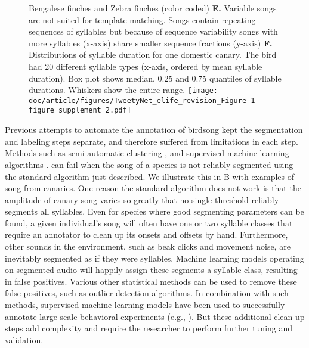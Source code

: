 \documentclass[9pt,lineno]{elife}
\begin{document}
\begin{figure}[!ht]
{Bengalese finches and Zebra finches (color coded)
\textbf{E.} Variable songs are not suited for template matching. 
Songs contain repeating sequences of syllables but because of sequence variability songs with more syllables (x-axis) share smaller sequence fractions (y-axis)
\textbf{F.} Distributions of syllable duration for one domestic canary. 
The bird had 20 different syllable types (x-axis, ordered by mean syllable duration). 
Box plot shows median, 0.25 and 0.75 quantiles of syllable durations. Whiskers show the entire range.
}{\texttt{[image: doc/article/figures/TweetyNet\_elife\_revision\_Figure 1 - figure supplement 2.pdf]}}\label{figsupp:sf2}
\end{figure} 

Previous attempts to automate the annotation of birdsong kept the segmentation and labeling steps separate,
and therefore suffered from limitations in each step.
Methods such as semi-automatic clustering 
\citep{burkett2015voice,daou2012computational}, 
and supervised machine learning algorithms
\citep{songbrowser, tachibana2014semi, nicholson2016comparison}.
can fail when the song of a species is not reliably  
segmented using the standard algorithm just described.
We illustrate this in B 
with examples of song from canaries. 
One reason the standard algorithm does not work is 
that the amplitude of canary song varies so greatly 
that no single threshold reliably segments all syllables. 
Even for species where good segmenting parameters can be found, 
a given individual's song will often have one or two syllable classes that require 
an annotator to clean up its onsets and offsets by hand.
Furthermore, other sounds in the environment, 
such as beak clicks and movement noise, are inevitably segmented as if they were syllables. 
Machine learning models operating on segmented audio 
will happily assign these segments a syllable class, 
resulting in false positives. 
Various other statistical methods can be used to remove these false positives, such as outlier detection algorithms. 
In combination with such methods, 
supervised machine learning models have been used 
to successfully annotate large-scale behavioral experiments (e.g., \cite{veit2021songbirds}). 
But these additional clean-up steps add complexity and require 
the researcher to perform further tuning and validation. 
\end{document}
